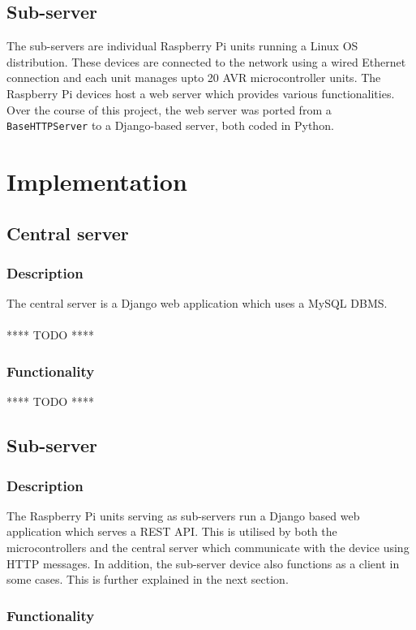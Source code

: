 \documentclass[letterpaper,11pt]{report}
\begin{document}
\section{Sub-server}
The sub-servers are individual Raspberry Pi units running a Linux OS distribution. These devices are connected to the network using a wired Ethernet connection and each unit manages upto 20 AVR microcontroller units. The Raspberry Pi devices host a web server which provides various functionalities. Over the course of this project, the web server was ported from a \verb|BaseHTTPServer| to a Django-based server, both coded in Python.

\newpage
\chapter{Implementation}\label{chapter:Implementation}
\onehalfspacing
\section{Central server}
\subsection{Description}
The central server is a Django web application which uses a MySQL DBMS.\\ \\
{\huge{**** TODO ****}}
\subsection{Functionality}
{\huge{**** TODO ****}}
\section{Sub-server}
\subsection{Description}
The Raspberry Pi units serving as sub-servers run a Django based web application which serves a REST API. This is utilised by both the microcontrollers and the central server which communicate with the device using HTTP messages. In addition, the sub-server device also functions as a client in some cases. This is further explained in the next section.
\subsection{Functionality}
\end{document}

